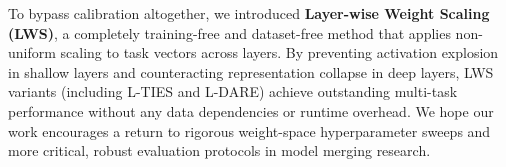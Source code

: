 \documentclass{article}
\theoremstyle{plain}
\theoremstyle{definition}
\theoremstyle{remark}
\begin{document}
To bypass calibration altogether, we introduced \textbf{Layer-wise Weight Scaling (LWS)}, a completely training-free and dataset-free method that applies non-uniform scaling to task vectors across layers. By preventing activation explosion in shallow layers and counteracting representation collapse in deep layers, LWS variants (including L-TIES and L-DARE) achieve outstanding multi-task performance without any data dependencies or runtime overhead. We hope our work encourages a return to rigorous weight-space hyperparameter sweeps and more critical, robust evaluation protocols in model merging research.



\end{document}
